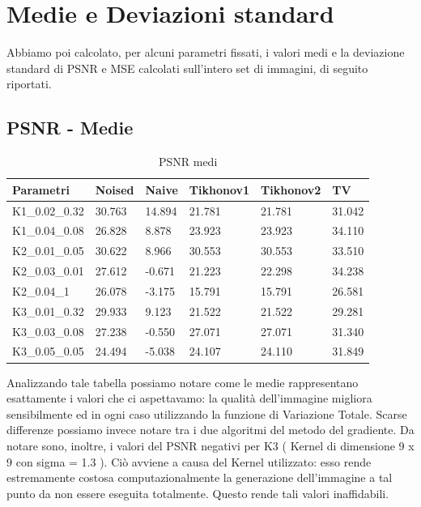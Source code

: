 \documentclass[12pt]{article}
\begin{document}
\newpage
\section{Medie e Deviazioni standard}
    Abbiamo poi calcolato, per alcuni parametri fissati, i valori medi e la deviazione standard di PSNR e MSE calcolati sull'intero set di immagini, di seguito riportati.

    \subsection{PSNR - Medie}

    \begin{table}[!h]
    \centering
    \begin{tabular}{|l|l|l|l|l|l|}
    \hline
        Parametri & Noised & Naive & Tikhonov1 & Tikhonov2 & TV \\ \hline
        K1\_0.02\_0.32 & 30.763 & 14.894 & 21.781 & 21.781 & 31.042 \\ \hline
        K1\_0.04\_0.08 & 26.828 & 8.878  & 23.923 & 23.923 & 34.110 \\ \hline
        K2\_0.01\_0.05 & 30.622 & 8.966  & 30.553 & 30.553 & 33.510 \\ \hline
        K2\_0.03\_0.01 & 27.612 & -0.671 & 21.223 & 22.298 & 34.238 \\ \hline
        K2\_0.04\_1    & 26.078 & -3.175 & 15.791 & 15.791 & 26.581 \\ \hline
        K3\_0.01\_0.32 & 29.933 & 9.123  & 21.522 & 21.522 & 29.281 \\ \hline
        K3\_0.03\_0.08 & 27.238 & -0.550 & 27.071 & 27.071 & 31.340 \\ \hline
        K3\_0.05\_0.05 & 24.494 & -5.038 & 24.107 & 24.110 & 31.849 \\ \hline
    \end{tabular}
    \caption{PSNR medi}
    \label{table:6}
    \end{table}

    Analizzando tale tabella possiamo notare come le medie rappresentano esattamente i valori che ci aspettavamo: la qualità dell'immagine migliora sensibilmente ed in ogni caso utilizzando la funzione di Variazione Totale. Scarse differenze possiamo invece notare tra i due algoritmi del metodo del gradiente.
    Da notare sono, inoltre, i valori del PSNR negativi per K3 ( Kernel di dimensione 9 x 9 con sigma = 1.3 ). Ciò avviene a causa del Kernel utilizzato: esso rende estremamente costosa computazionalmente la generazione dell'immagine a tal punto da non essere eseguita totalmente. Questo rende tali valori inaffidabili.
\end{document}
